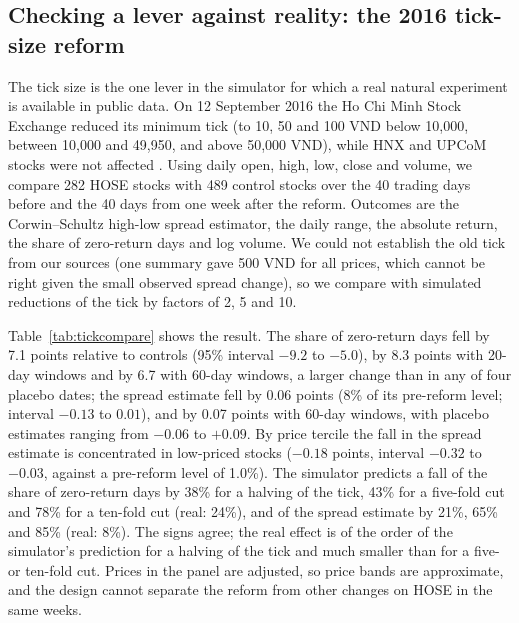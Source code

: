 \documentclass[11pt,a4paper]{article}
\begin{document}
\subsection{Checking a lever against reality: the 2016 tick-size reform}\label{sec:tick}

The tick size is the one lever in the simulator for which a real natural experiment is available in public data. On 12 September 2016 the Ho Chi Minh Stock Exchange reduced its minimum tick (to 10, 50 and 100 VND below 10,000, between 10,000 and 49,950, and above 50,000 VND), while HNX and UPCoM stocks were not affected \citep[according to][]{vo2023}. Using daily open, high, low, close and volume, we compare 282 HOSE stocks with 489 control stocks over the 40 trading days before and the 40 days from one week after the reform. Outcomes are the Corwin--Schultz high-low spread estimator, the daily range, the absolute return, the share of zero-return days and log volume. We could not establish the old tick from our sources (one summary gave 500 VND for all prices, which cannot be right given the small observed spread change), so we compare with simulated reductions of the tick by factors of 2, 5 and 10.

Table~\ref{tab:tickcompare} shows the result. The share of zero-return days fell by 7.1 points relative to controls (95\% interval $-9.2$ to $-5.0$), by 8.3 points with 20-day windows and by 6.7 with 60-day windows, a larger change than in any of four placebo dates; the spread estimate fell by 0.06 points (8\% of its pre-reform level; interval $-0.13$ to $0.01$), and by 0.07 points with 60-day windows, with placebo estimates ranging from $-0.06$ to $+0.09$. By price tercile the fall in the spread estimate is concentrated in low-priced stocks ($-0.18$ points, interval $-0.32$ to $-0.03$, against a pre-reform level of 1.0\%). The simulator predicts a fall of the share of zero-return days by 38\% for a halving of the tick, 43\% for a five-fold cut and 78\% for a ten-fold cut (real: 24\%), and of the spread estimate by 21\%, 65\% and 85\% (real: 8\%). The signs agree; the real effect is of the order of the simulator's prediction for a halving of the tick and much smaller than for a five- or ten-fold cut. Prices in the panel are adjusted, so price bands are approximate, and the design cannot separate the reform from other changes on HOSE in the same weeks.

\begin{table}[t]
\centering\scriptsize
\setlength{\tabcolsep}{3pt}
\caption{Tick-size reform: real difference-in-differences against the simulator's prediction for a reduction of the tick by a factor of 2, 5 or 10. Changes relative to the pre-reform level.}\label{tab:tickcompare}
\end{table}
\end{document}
